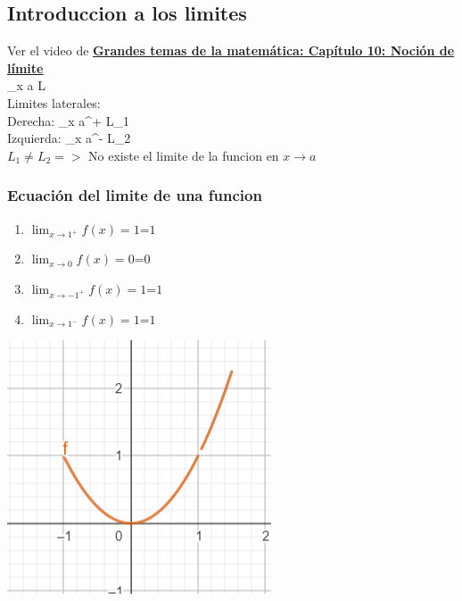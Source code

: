 \documentclass[stu, 12pt, a4paper, donotrepeattitle, floatsintext, natbib]{apa7}
\begin{document}
    \subsection{Introduccion a los limites}\label{subsec:introduccion-a-los-limites}
    Ver el video de \href{https://youtu.be/eCB_Jr_VKyg?si=yKF3rE8HdfUNQ4gu}{\textbf{\color{blue}Grandes temas de la matemática: Capítulo 10: Noción de límite}}\\[0.5cm]

    \displaystyle\lim_{{x \to a}} L\\[0.5cm]
    Limites laterales:\\[0.5cm]
    Derecha: \displaystyle\lim_{{x \to a}^+} L_1\\
    Izquierda: \displaystyle\lim_{{x \to a}^-} L_2\\[0.5cm]

    $L_1 \neq L_2 =>$     No existe el limite de la funcion en $x \to a$\\[0.5cm]

    \subsubsection{Ecuación del limite de una funcion}
    \begin{paracol}{2}
        \begin{enumerate}
            \item $\displaystyle\lim_{{x \to 1^+}} f(x)=1 \textbf{=} 1$
            \item $\displaystyle\lim_{{x \to 0}} f(x)=0 \textbf{=} 0$
            \item $\displaystyle\lim_{{x \to -1^+}} f(x)=1 \textbf{=} 1$
            \item $\displaystyle\lim_{{x \to 1^-}} f(x)=1 \textbf{=} 1$
        \end{enumerate}
        \switchcolumn
        \includegraphics[scale=1]{lim}
    \end{paracol}
\end{document}
